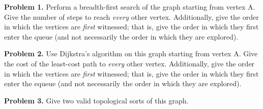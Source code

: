 \documentclass{article}
\begin{document}

\vspace*{5mm}\par\textbf{Problem 1.} Perform a breadth-first search of the graph starting from vertex A.  Give the number of steps to reach \emph{every} other vertex.  Additionally, give the order in which the vertices are \emph{first} witnessed; that is, give the order in which they first enter the queue (and not necessarily the order in which they are explored).\par


\vspace*{10mm}\par\textbf{Problem 2.} Use Dijkstra's algorithm on this graph starting from vertex A.  Give the cost of the least-cost path to \emph{every} other vertex.  Additionally, give the order in which the vertices are \emph{first} witnessed; that is, give the order in which they first enter the equeue (and not necessarily the order in which they are explored).\par


\vspace*{10mm}\par\textbf{Problem 3.} Give two valid topological sorts of this graph.\par


\end{document}
